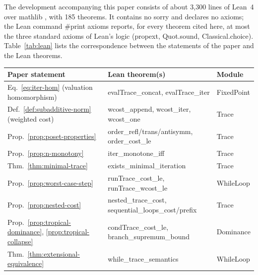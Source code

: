 \documentclass[oneside,english]{amsart}
\numberwithin{equation}{section}
\numberwithin{figure}{section}
\theoremstyle{plain}
\theoremstyle{definition}
\theoremstyle{plain}
\theoremstyle{remark}
\theoremstyle{plain}
\theoremstyle{definition}
\theoremstyle{plain}
\theoremstyle{remark}
\newcommand{\lean}[1]{{\ttfamily\small #1}}
\begin{document}
The development accompanying this paper consists of about 3{,}300 lines of Lean~4 \cite{demoura2021lean4} over mathlib \cite{mathlib2020}, with 185 theorems. It contains no \lean{sorry} and declares no axioms; the Lean command \lean{\#print axioms} reports, for every theorem cited here, at most the three standard axioms of Lean's logic (\lean{propext}, \lean{Quot.\allowbreak sound}, \lean{Classical.\allowbreak choice}). Table~\ref{tab:lean} lists the correspondence between the statements of the paper and the Lean theorems.

\begin{table}[ht]
\centering
\footnotesize
\begin{tabular}{@{}>{\raggedright\arraybackslash}p{}>{\raggedright\arraybackslash}p{}>{\raggedright\arraybackslash}p{}@{}}
\toprule
Paper statement & Lean theorem(s) & Module \\
\midrule
Eq.~\eqref{eq:iter-hom} (valuation homomorphism) & \lean{evalTrace\_\allowbreak concat}, \lean{evalTrace\_\allowbreak iter} & \lean{FixedPoint} \\
Def.~\ref{def:subadditive-norm} (weighted cost) & \lean{wcost\_\allowbreak append}, \lean{wcost\_\allowbreak iter}, \lean{wcost\_\allowbreak one} & \lean{Trace} \\
Prop.~\ref{prop:poset-properties} & \lean{order\_\allowbreak refl/\allowbreak trans/\allowbreak antisymm}, \lean{order\_\allowbreak cost\_\allowbreak le} & \lean{Trace} \\
Prop.~\ref{prop:n-monotony} & \lean{iter\_\allowbreak monotone\_\allowbreak iff} & \lean{Trace} \\
Thm.~\ref{thm:minimal-trace} & \lean{exists\_\allowbreak minimal\_\allowbreak iteration} & \lean{Trace} \\
Prop.~\ref{prop:worst-case-step} & \lean{runTrace\_\allowbreak cost\_\allowbreak le}, \lean{runTrace\_\allowbreak wcost\_\allowbreak le} & \lean{WhileLoop} \\
Prop.~\ref{prop:nested-cost} & \lean{nested\_\allowbreak trace\_\allowbreak cost}, \lean{sequential\_\allowbreak loops\_\allowbreak cost/\allowbreak prefix} & \lean{Trace} \\
Prop.~\ref{prop:tropical-dominance}, \ref{prop:tropical-collapse} & \lean{condTrace\_\allowbreak cost\_\allowbreak le}, \lean{branch\_\allowbreak supremum\_\allowbreak bound} & \lean{Dominance} \\
Thm.~\ref{thm:extensional-equivalence} & \lean{while\_\allowbreak trace\_\allowbreak semantics} & \lean{WhileLoop} \\

\end{tabular}
\end{table}
\end{document}
